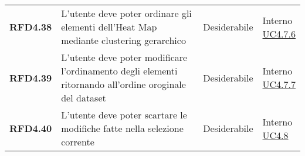 \begin{longtable}[H]{>{\raggedright\bfseries}m{20mm} >{\raggedright}m{90mm} >{\raggedright}m{28mm} >{\raggedright\arraybackslash}m{30mm}}
    RFD4.38
    & L'utente deve poter ordinare gli elementi dell'Heat Map mediante clustering gerarchico
    & Desiderabile
    & \makecell{ Interno \\  \hyperref[spar:uc4.7.6]{UC4.7.6} }\\

    RFD4.39
    & L'utente deve poter modificare l'ordinamento degli elementi ritornando all'ordine oroginale del dataset
    & Desiderabile
    & \makecell{ Interno \\  \hyperref[spar:uc4.7.7]{UC4.7.7} }\\

    RFD4.40
    & L'utente deve poter scartare le modifiche fatte nella selezione corrente
    & Desiderabile
    & \makecell{ Interno \\  \hyperref[ssub:uc4.8]{UC4.8} }\\

\end{longtable}
